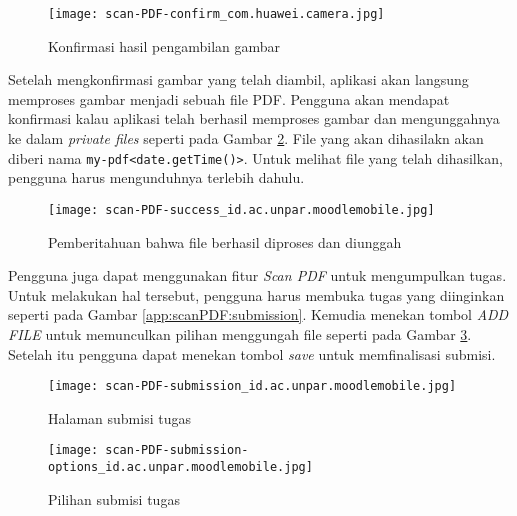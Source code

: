 \begin{figure}[H] 
	\centering  
	\texttt{[image: scan-PDF-confirm\_com.huawei.camera.jpg]}  
	\caption[Konfirmasi hasil pengambilan gambar] {Konfirmasi hasil pengambilan gambar} 
	\label{app:scanPDF:confirm} 
\end{figure}  

Setelah mengkonfirmasi gambar yang telah diambil, aplikasi akan langsung memproses gambar menjadi sebuah file PDF. Pengguna akan mendapat konfirmasi kalau aplikasi telah berhasil memproses gambar dan mengunggahnya ke dalam \textit{private files} seperti pada Gambar \ref{app:scanPDF:success}. File yang akan dihasilakn akan diberi nama \texttt{my-pdf<date.getTime()>}. Untuk melihat file yang telah dihasilkan, pengguna harus mengunduhnya terlebih dahulu.

\begin{figure}[H] 
	\centering  
	\texttt{[image: scan-PDF-success\_id.ac.unpar.moodlemobile.jpg]}  
	\caption[Pemberitahuan bahwa file berhasil diproses dan diunggah] {Pemberitahuan bahwa file berhasil diproses dan diunggah} 
	\label{app:scanPDF:success} 
\end{figure}  

Pengguna juga dapat menggunakan fitur \textit{Scan PDF} untuk mengumpulkan tugas. Untuk melakukan hal tersebut, pengguna harus membuka tugas yang diinginkan seperti pada Gambar \ref{app:scanPDF:submission}. Kemudia menekan tombol \textit{ADD FILE} untuk memunculkan pilihan menggungah file seperti pada Gambar \ref{app:scanPDF:submission:options}. Setelah itu pengguna dapat menekan tombol \textit{save} untuk memfinalisasi submisi.

\begin{figure}[H]
	\centering
	\begin{minipage}{.3\textwidth}
	\centering  
	\texttt{[image: scan-PDF-submission\_id.ac.unpar.moodlemobile.jpg]}  
	\caption[Halaman submisi tugas] {Halaman submisi tugas} 
	\label{app:scanPDF:submission} 
	\end{minipage}
	\hspace{.3\textwidth}
	\begin{minipage}{.3\textwidth}
	\centering  
	\texttt{[image: scan-PDF-submission-options\_id.ac.unpar.moodlemobile.jpg]}  
	\caption[Pilihan submisi tugas] {Pilihan submisi tugas} 
	\label{app:scanPDF:submission:options} 
	\end{minipage}
\end{figure}


